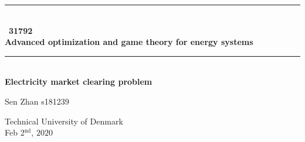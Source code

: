 \thispagestyle{empty}
\begin{center}

\parindent=0pt
\newcommand{\HRule}{\rule{\textwidth}{0.5mm}}

\begin{figure}[H]
\centering
\end{figure}
\HRule\\[0.5 cm]\Huge\
\textbf {31792}\\
    \Huge \textbf{Advanced optimization and game theory for energy systems}
 \\ [0.3 cm]
\huge 
\HRule\\[1 cm]  

{}\vspace{1cm}
\normalsize
{\huge \bfseries Electricity market clearing problem
}\\ [1.5cm] 
 \Large

\vspace{0cm}
Sen Zhan s181239\\ 





 \normalsize %
\begin{flushleft}
\centering
\small Technical University of Denmark\\
\small Feb 2$^{\textrm{nd}}$, $2020$ \\ 
\vspace{0.4cm}

\end{flushleft} 
\end{center}
